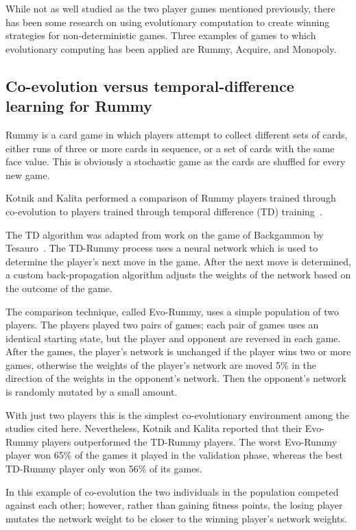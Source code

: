 While not as well studied as the two player games mentioned previously, there
has been some research on using evolutionary computation to create winning
strategies for non-deterministic games. Three examples of games to which
evolutionary computing has been applied are Rummy, Acquire, and Monopoly.

\subsection{Co-evolution versus temporal-difference learning for Rummy}

Rummy is a card game in which players attempt to collect different sets of
cards, either runs of three or more cards in sequence, or a set of cards with
the same face value. This is obviously a stochastic game as the cards are
shuffled for every new game.

Kotnik and Kalita performed a comparison of Rummy players trained through
co-evolution to players trained through temporal difference (TD)
training~\cite{kotnik2003significance}.

The TD algorithm was adapted from work on the game of Backgammon by
Tesauro~\cite{tesauro1992practical,Tesauro:1995:TDL:203330.203343}. The TD-Rummy
process uses a neural network which is used to determine the player's next move
in the game. After the next move is determined, a custom back-propagation
algorithm adjusts the weights of the network based on the outcome of the game.

The comparison technique, called Evo-Rummy, uses a simple population of two
players. The players played two pairs of games; each pair of games uses an
identical starting state, but the player and opponent are reversed in each game.
After the games, the player's network is unchanged if the player wins two or
more games, otherwise the weights of the player's network are moved 5\% in the
direction of the weights in the opponent's network. Then the opponent's network
is randomly mutated by a small amount. 

With just two players this is the simplest co-evolutionary environment among the
studies cited here. Nevertheless, Kotnik and Kalita reported that their
Evo-Rummy players outperformed the TD-Rummy players. The worst Evo-Rummy player
won 65\% of the games it played in the validation phase, whereas the best
TD-Rummy player only won 56\% of its games.

In this example of co-evolution the two individuals in the population competed
against each other; however, rather than gaining fitness points, the losing
player mutates the network weight to be closer to the winning player's network
weights.

